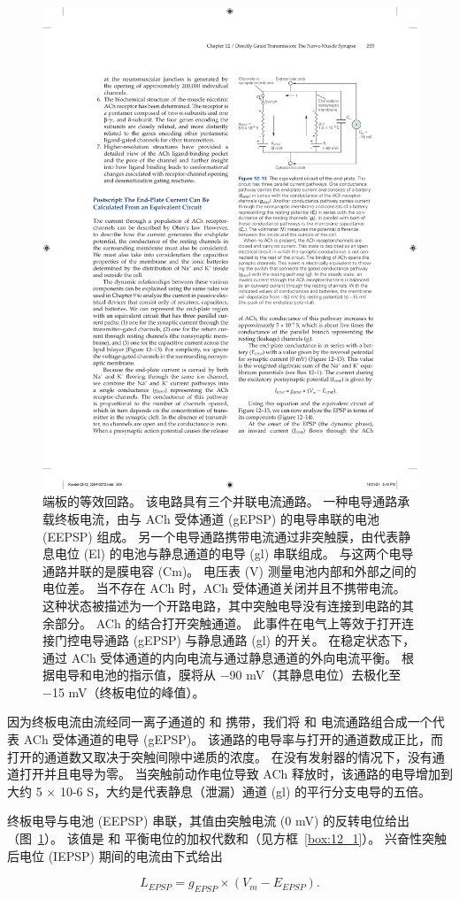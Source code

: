 \begin{figure}[htbp]
	\centering
	\includegraphics[width=0.5\linewidth]{chap12/fig_12_13}
	\caption{端板的等效回路。 该电路具有三个并联电流通路。 一种电导通路承载终板电流，由与 ACh 受体通道 (gEPSP) 的电导串联的电池 (EEPSP) 组成。 另一个电导通路携带电流通过非突触膜，由代表静息电位 (El) 的电池与静息通道的电导 (gl) 串联组成。 与这两个电导通路并联的是膜电容 (Cm)。 电压表 (V) 测量电池内部和外部之间的电位差。 当不存在 ACh 时，ACh 受体通道关闭并且不携带电流。 这种状态被描述为一个开路电路，其中突触电导没有连接到电路的其余部分。 ACh 的结合打开突触通道。 此事件在电气上等效于打开连接门控电导通路 (gEPSP) 与静息通路 (gl) 的开关。 在稳定状态下，通过 ACh 受体通道的内向电流与通过静息通道的外向电流平衡。 根据电导和电池的指示值，膜将从 −90 mV（其静息电位）去极化至 −15 mV（终板电位的峰值）。}
	\label{fig:12_13}
\end{figure}


因为终板电流由流经同一离子通道的  和  携带，我们将  和  电流通路组合成一个代表 ACh 受体通道的电导 (gEPSP)。
该通路的电导率与打开的通道数成正比，而打开的通道数又取决于突触间隙中递质的浓度。
在没有发射器的情况下，没有通道打开并且电导为零。
当突触前动作电位导致 ACh 释放时，该通路的电导增加到大约 5 × 10-6 S，大约是代表静息（泄漏）通道 (gl) 的平行分支电导的五倍。


终板电导与电池 (EEPSP) 串联，其值由突触电流 (0 mV) 的反转电位给出（图~\ref{fig:12_13}）。
该值是  和  平衡电位的加权代数和（见方框~\ref{box:12_1}）。
兴奋性突触后电位 (IEPSP) 期间的电流由下式给出


\begin{equation}\label{excitatory_potential}
	L_{EPSP} = g_{EPSP} \times (V_m - E_{EPSP}).
\end{equation}


